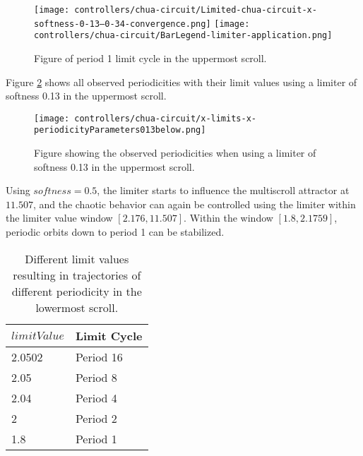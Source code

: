 \documentclass[main]{subfiles}
\begin{document}
\begin{figure}[H]
\centering
\texttt{[image: controllers/chua-circuit/Limited-chua-circuit-x-softness-0-13--0-34-convergence.png]}
\texttt{[image: controllers/chua-circuit/BarLegend-limiter-application.png]}
\caption[Figure of period 1 limit cycle using a 0.13 soft limiter]{Figure of period 1 limit cycle in the uppermost scroll.}
\label{figure:x-0.13-1-limit-cycle-upperscroll-trajectory}
\end{figure}

Figure \ref{figure:x-limits-x-periodicityParameters013above} shows all observed periodicities with their limit values using a limiter of softness 0.13 in the uppermost scroll. 
\begin{figure}[H]
\centering
\texttt{[image: controllers/chua-circuit/x-limits-x-periodicityParameters013below.png]}
\caption[Figure of observed periodicities in the uppermost scroll with a self-limiting 0.13 limiter]{Figure showing the observed periodicities when using a limiter of softness 0.13 in the uppermost scroll.}
\label{figure:x-limits-x-periodicityParameters013above}
\end{figure}

Using \(softness=0.5\), the limiter starts to influence the multiscroll attractor at \(11.507\), and the chaotic behavior can again be controlled using the limiter within the limiter value window \([2.176,11.507]\). %
%
Within the window \([1.8,2.1759]\), periodic orbits down to period 1 can be stabilized.

\begin{table}[H]
\renewcommand{\arraystretch}{1.2}
\center
\begin{tabular}{@{}ll@{}}
	\toprule
   \(limitValue\) & Limit Cycle\\
   \midrule
   2.0502 & Period 16 \\
   2.05 & Period 8 \\ 
   2.04 & Period 4 \\
   2  & Period 2 \\
   1.8 & Period 1 \\
   \bottomrule
\end{tabular}
\caption[Limiter values for periodic trajectories for an x self-limiting limiter with softness 0.5]{Different limit values resulting in trajectories of different periodicity in the lowermost scroll.}
\label{table:x-0.5-lowermost-periodicities}
\end{table}
\end{document}
